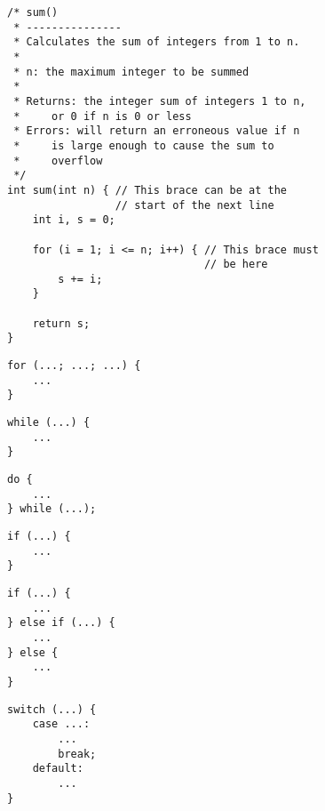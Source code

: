 \documentclass{article}
\begin{document}
\begin{multicols}{2}
\nolinenumbers
\begin{lstlisting}
/* sum()
 * ---------------
 * Calculates the sum of integers from 1 to n.
 *
 * n: the maximum integer to be summed
 *
 * Returns: the integer sum of integers 1 to n,
 *     or 0 if n is 0 or less
 * Errors: will return an erroneous value if n 
 *     is large enough to cause the sum to
 *     overflow
 */
int sum(int n) { // This brace can be at the
                 // start of the next line
    int i, s = 0;

    for (i = 1; i <= n; i++) { // This brace must 
                               // be here
        s += i;
    }

    return s;
}
\end{lstlisting}


\begin{lstlisting}
for (...; ...; ...) {
    ...
}
\end{lstlisting}

\begin{lstlisting}
while (...) {
    ...
}
\end{lstlisting}
\vfill
\columnbreak
{}
\begin{lstlisting}
do {
    ...
} while (...);
\end{lstlisting}

\begin{lstlisting}
if (...) {
    ...
}
\end{lstlisting}


\begin{lstlisting}
if (...) {
    ...
} else if (...) {
    ...
} else {
    ...
}
\end{lstlisting}

\begin{lstlisting}
switch (...) {
    case ...:
        ...
        break;
    default:
        ...
}
\end{lstlisting}
\end{multicols}
\linenumbers
\end{document}
